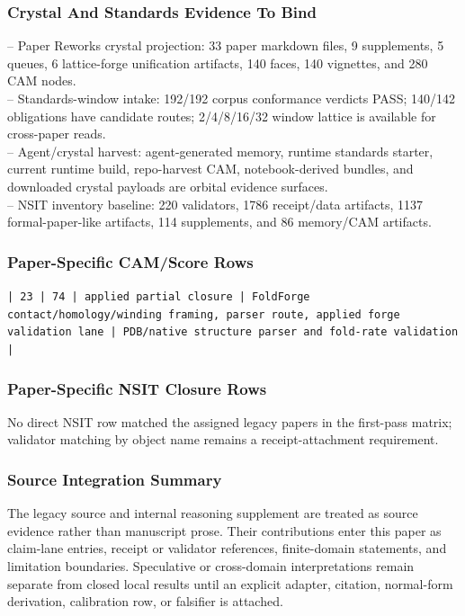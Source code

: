 \documentclass[11pt]{article}
\begin{document}
\subsubsection*{Crystal And Standards Evidence To Bind}

\noindent{}-- Paper Reworks crystal projection: 33 paper markdown files, 9 supplements, 5 queues, 6 lattice-forge unification artifacts, 140 faces, 140 vignettes, and 280 CAM nodes.\\
\noindent{}-- Standards-window intake: 192/192 corpus conformance verdicts PASS; 140/142 obligations have candidate routes; 2/4/8/16/32 window lattice is available for cross-paper reads.\\
\noindent{}-- Agent/crystal harvest: agent-generated memory, runtime standards starter, current runtime build, repo-harvest CAM, notebook-derived bundles, and downloaded crystal payloads are orbital evidence surfaces.\\
\noindent{}-- NSIT inventory baseline: 220 validators, 1786 receipt/data artifacts, 1137 formal-paper-like artifacts, 114 supplements, and 86 memory/CAM artifacts.\\

\subsubsection*{Paper-Specific CAM/Score Rows}

\noindent\texttt{| 23 | 74 | applied partial closure | FoldForge contact/homology/winding framing, parser route, applied forge validation lane | PDB/native structure parser and fold-rate validation |}\\

\subsubsection*{Paper-Specific NSIT Closure Rows}

No direct NSIT row matched the assigned legacy papers in the first-pass matrix; validator matching by object name remains a receipt-attachment requirement.

\subsubsection*{Source Integration Summary}

The legacy source and internal reasoning supplement are treated as source
evidence rather than manuscript prose. Their contributions enter this paper as
claim-lane entries, receipt or validator references, finite-domain statements,
and limitation boundaries. Speculative or cross-domain interpretations remain
separate from closed local results until an explicit adapter, citation,
normal-form derivation, calibration row, or falsifier is attached.
\end{document}
